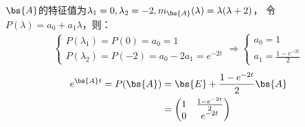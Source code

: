 \documentclass[12pt, a4paper, oneside, UTF8]{ctexbook}
\begin{document}
\begin{solution}
    $\bs{A}$的特征值为$\lambda_1=0,\lambda_2=-2,m_{\bs{A}}(\lambda)=\lambda(\lambda+2)$，
    令$P(\lambda)=a_0+a_1\lambda$，则：
    \begin{align*}
        \left\{
            \begin{array}{ll}
                P(\lambda_1)=P(0)=a_0=1\\
                P(\lambda_2)=P(-2)=a_0-2a_1=e^{-2t}
            \end{array}
            \right.
        \Rightarrow
        \left\{
        \begin{array}{ll}
            a_0=1\\
            a_1=\frac{1-e^{-2t}}{2}
        \end{array}
        \right.
    \end{align*}
    \begin{align*}
        e^{\bs{A}t}=P(\bs{A})
    &=\bs{E}+\frac{1-e^{-2t}}{2}\bs{A}\\
    &=\begin{pmatrix}
        1 &\frac{1-e^{-2t}}{2} \\
        0 & e^{-2t}
    \end{pmatrix}
    \end{align*}


\end{solution}
\end{document}
